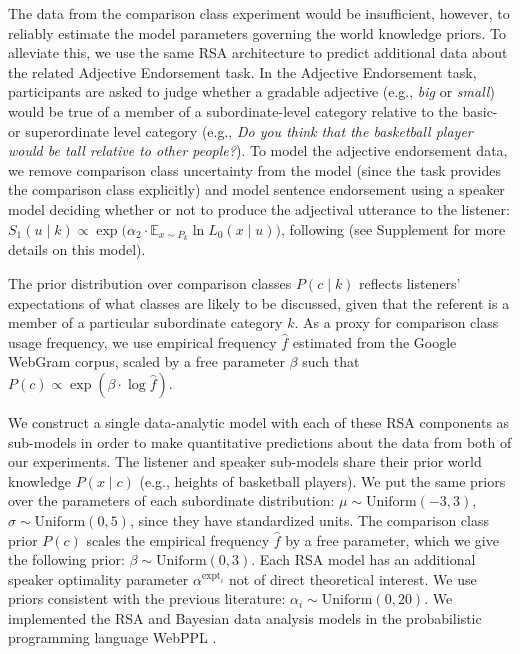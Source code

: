\documentclass[doc]{apa6}
\begin{document}
The data from the comparison class experiment would be insufficient, however, to reliably estimate the model parameters governing the world knowledge priors. 
To alleviate this, we use the same RSA architecture to predict additional data about the related Adjective Endorsement task. 
In the Adjective Endorsement task, participants are asked to judge whether a gradable adjective (e.g., \emph{big} or \emph{small}) would be true of a member of a subordinate-level category relative to the basic- or superordinate level category (e.g., \emph{Do you think that the basketball player would be tall relative to other people?}).
To model the adjective endorsement data, we remove comparison class uncertainty from the model (since the task provides the comparison class explicitly) and model sentence endorsement using a speaker model deciding whether or not to produce the adjectival utterance to the listener: $S_{1}(u \mid k) \propto \exp{(\alpha_2 \cdot {\mathbb E}_{x\sim P_{k}}} \ln{L_0(x \mid u)})$, following  (see Supplement for more details on this model). 

The prior distribution over comparison classes $P(c \mid k)$ reflects listeners' expectations of what classes are likely to be discussed, given that the referent is a member of a particular subordinate category $k$. 
As a proxy for comparison class usage frequency, we use empirical frequency \(\hat{f}\) estimated from the Google WebGram corpus, scaled by a free parameter $\beta$ such that $P(c) \propto \exp{(\beta \cdot \log \hat{f})}$.

We construct a single data-analytic model with each of these RSA components as sub-models in order to make quantitative predictions about the data from both of our experiments.
The listener and speaker sub-models share their prior world knowledge $P(x \mid c)$ (e.g., heights of basketball players).
We put the same priors over the parameters of each subordinate distribution: $\mu \sim \text{Uniform}(-3, 3)$, $\sigma \sim \text{Uniform}(0, 5)$, since they have standardized units.
The comparison class prior $P(c)$ scales the empirical frequency $\hat{f}$ by a free parameter, which we give the following prior: $\beta \sim \text{Uniform}(0, 3)$. 
Each RSA model has an additional speaker optimality parameter $\alpha^{\text{expt}_{i}}$ not of direct theoretical interest.
We use priors consistent with the previous literature: $\alpha_i \sim \text{Uniform}(0, 20)$.
We implemented the RSA and Bayesian data analysis models in the probabilistic programming language WebPPL \cite{dippl}.
\end{document}
